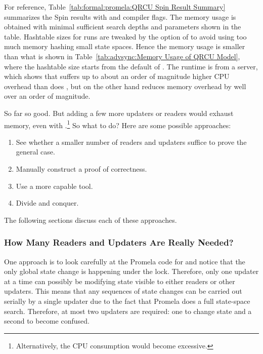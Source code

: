 For reference, Table~\ref{tab:formal:promela:QRCU Spin Result Summary}
summarizes the Spin results with  and 
compiler flags.
The memory usage is obtained with minimal sufficient
search depths and  parameters shown in the table.
Hashtable sizes for  runs are tweaked by
the  option of  to avoid using too much
memory hashing small state spaces.
Hence the memory usage is smaller than what is shown in
Table~\ref{tab:advsync:Memory Usage of QRCU Model}, where the
hashtable size starts from the default of .
The runtime is from a  server, which shows that 
suffers up to about an order of magnitude higher CPU overhead
than does , but on the other hand reduces memory overhead
by well over an order of magnitude.

So far so good.
But adding a few more updaters or readers would exhaust memory, even
with .\footnote{
	Alternatively, the CPU consumption would become excessive.}
So what to do?
Here are some possible approaches:

\begin{enumerate}
\item	See whether a smaller number of readers and updaters suffice
	to prove the general case.
\item	Manually construct a proof of correctness.
\item	Use a more capable tool.
\item	Divide and conquer.
\end{enumerate}

The following sections discuss each of these approaches.

\subsubsection{How Many Readers and Updaters Are Really Needed?}
\label{sec:formal:How Many Readers and Updaters Are Really Needed?}

One approach is to look carefully at the Promela code for
 and notice that the only global state
change is happening under the lock.
Therefore, only one updater at a time can possibly be modifying
state visible to either readers or other updaters.
This means that any sequences of state changes can be carried
out serially by a single updater due to the fact that Promela does a full
state-space search.
Therefore, at most two updaters are required: one to change state
and a second to become confused.

